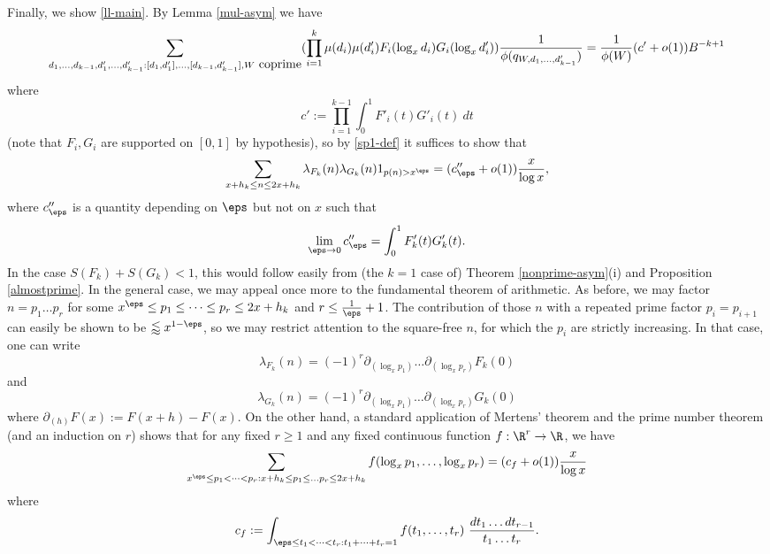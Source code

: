 Finally, we show \eqref{ll-main}.  By Lemma \ref{mul-asym} we have
$$
 \sum_{d_1,\dots,d_{k-1},d'_1,\dots,d'_{k-1}: [d_1,d'_1],\dots,[d_{k-1},d'_{k-1}], W \hbox{ coprime}} (\prod_{i=1}^k \mu(d_{i}) \mu(d'_{i}) F_{i}(\log_x d_{i}) G_{i}(\log_x d'_{i})) \frac{1}{\phi(q_{W,d_1,\dots,d'_{k-1}})} = \frac{1}{\phi(W)} (c'+o(1)) B^{-k+1}$$
where
$$ c' := \prod_{i=1}^{k-1} \int_0^1 F'_i(t) G'_i(t)\ dt$$
(note that $F_i, G_i$ are supported on $[0,1]$ by hypothesis), so by \eqref{sp1-def} it suffices to show that
\begin{equation}\label{cpeps}
\sum_{x+h_k \leq n \leq 2x+h_k} \lambda_{F_k}(n) \lambda_{G_k}(n) 1_{p(n)>x^\eps} = (c''_\eps + o(1)) \frac{x}{\log x},
\end{equation}
where $c''_{\eps}$ is a quantity depending on $\eps$ but not on $x$ such that
$$ \lim_{\eps \to 0} c''_{\eps} = \int_0^1 F'_k(t) G'_k(t).$$
In the case $S(F_k)+S(G_k) < 1$, this would follow easily from (the $k=1$ case of) Theorem \ref{nonprime-asym}(i) and Proposition \ref{almostprime}.  In the general case, we may appeal once more to the fundamental theorem of arithmetic.  As before, we may factor $n = p_1 \dots p_r$ for some $x^\eps \leq p_1 \leq \dots \leq p_r \leq 2x+h_k$ and $r \leq \frac{1}{\eps}+1$.  The contribution of those $n$ with a repeated prime factor $p_i = p_{i+1}$ can easily be shown to be $\lessapprox x^{1-\eps}$, so we may restrict attention to the square-free $n$, for which the $p_i$ are strictly increasing.  In that case, one can write
$$ \lambda_{F_k}(n) = (-1)^r \partial_{(\log_x p_1)} \dots \partial_{(\log_x p_r)} F_k(0)$$
and
$$ \lambda_{G_k}(n) = (-1)^r \partial_{(\log_x p_1)} \dots \partial_{(\log_x p_r)} G_k(0)$$
where $\partial_{(h)} F(x) := F(x+h)-F(x)$.  On the other hand, a standard application of Mertens' theorem and the prime number theorem (and an induction on $r$) shows that for any fixed $r \geq 1$ and any fixed continuous function $f: \R^r \to \R$, we have
$$ \sum_{x^\eps \leq p_1 < \dots < p_r: x+h_k \leq p_1 \leq \dots p_r \leq 2x+h_k} f(\log_x p_1,\dots, \log_x p_r) = (c_f + o(1)) \frac{x}{\log x} $$
where
$$ c_f := \int_{\eps \leq t_1 < \dots < t_r: t_1 + \dots + t_r = 1} f( t_1,\dots,t_r)\ \frac{dt_1 \dots dt_{r-1}}{t_1 \dots t_r}.$$

